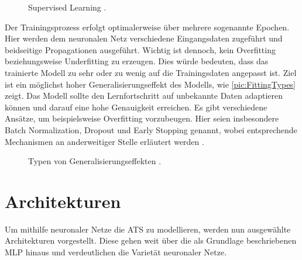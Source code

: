 \begin{figure}[h!]
  \centering
  \caption{Supervised Learning \cite[S.~3]{RAS19}.}
  \label{pic:SupervisedLearning}
\end{figure}

\noindent
Der Trainingsprozess erfolgt optimalerweise über mehrere sogenannte Epochen. Hier werden dem neuronalen Netz verschiedene Eingangsdaten zugeführt und beidseitige Propagationen ausgeführt. Wichtig ist dennoch, kein Overfitting beziehungsweise Underfitting zu erzeugen. Dies würde bedeuten, dass das trainierte Modell zu sehr oder zu wenig auf die Trainingsdaten angepasst ist. Ziel ist ein möglichst hoher Generalisierungseffekt des Modells, wie \autoref{pic:FittingTypes} zeigt. Das Modell sollte den Lernfortschritt auf unbekannte Daten adaptieren können und darauf eine hohe Genauigkeit erreichen. Es gibt verschiedene Ansätze, um beispielsweise Overfitting vorzubeugen. Hier seien insbesondere Batch Normalization, Dropout und Early Stopping genannt, wobei entsprechende Mechanismen an anderweitiger Stelle erläutert werden \cite[S.~143-149]{ZHA20}.\\

\begin{figure}[h!]
  \centering
  \caption{Typen von Generalisierungseffekten \cite{EDPOJ}.}
  \label{pic:FittingTypes}
\end{figure}
\newpage


\section{Architekturen}
\noindent
Um mithilfe neuronaler Netze die \ac{ATS} zu modellieren, werden nun ausgewählte Architekturen vorgestellt. Diese gehen weit über die als Grundlage beschriebenen \ac{MLP} hinaus und verdeutlichen die Varietät neuronaler Netze.


